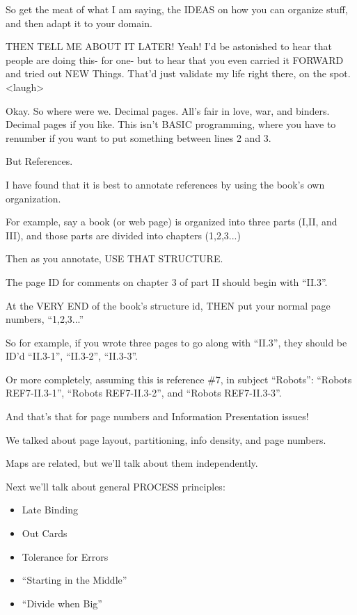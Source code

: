\documentclass[oneside]{book}
\begin{document}
So get the meat of what I am saying, the IDEAS on how you can organize
stuff, and then adapt it to your domain.

THEN TELL ME ABOUT IT LATER! Yeah! I'd be astonished to hear that
people are doing this- for one- but to hear that you even carried it
FORWARD and tried out NEW Things. That'd just validate my life right
there, on the spot. <laugh>

Okay. So where were we. Decimal pages. All's fair in love, war, and
binders. Decimal pages if you like. This isn't BASIC programming,
where you have to renumber if you want to put something between lines
2 and 3.

But References.

I have found that it is best to annotate references by using the
book's own organization.

For example, say a book (or web page) is organized into three parts
(I,II, and III), and those parts are divided into chapters (1,2,3...)

Then as you annotate, USE THAT STRUCTURE.

The page ID for comments on chapter 3 of part II should begin with
``II.3''.

At the VERY END of the book's structure id, THEN put your normal page
numbers, ``1,2,3...''

So for example, if you wrote three pages to go along with ``II.3'', they
should be ID'd ``II.3-1'', ``II.3-2'', ``II.3-3''.

Or more completely, assuming this is reference \#7, in subject
``Robots'': ``Robots REF7-II.3-1'', ``Robots REF7-II.3-2'', and ``Robots
REF7-II.3-3''.

And that's that for page numbers and Information Presentation issues!

We talked about page layout, partitioning, info density, and page
numbers.

Maps are related, but we'll talk about them independently.

Next we'll talk about general PROCESS principles:

\begin{itemize}
\item Late Binding
\item Out Cards
\item Tolerance for Errors
\item ``Starting in the Middle''
\item ``Divide when Big''
\end{itemize}
\end{document}
